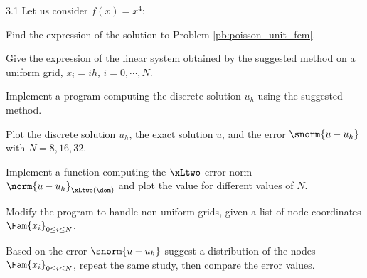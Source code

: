 \begin{tmaxrcs}{}{3.1}
\medskip
Let us consider $f(x) = x^4$:
\begin{tmatsks}
\item Find the expression of the solution to Problem \ref{pb:poisson_unit_fem}.
\item Give the expression of the linear system obtained by the suggested method on a uniform grid, \ie $x_i = i h$, $i = 0,\cdots, N$.
\item Implement a program computing the discrete solution $u_h$ using the suggested method.
\item Plot the discrete solution $u_h$, the exact solution $u$, and the error $\snorm{u - u_h}$ with $N=8,16,32$.
\item Implement a function computing the $\xLtwo$ error-norm $\norm{u -u _h}_{\xLtwo(\dom)}$ and plot the value for different values of $N$.
\item Modify the program to handle non-uniform grids, given a list of node coordinates $\Fam{x_i}_{0\leq i\leq N}$.
\item Based on the error $\snorm{u -u _h}$ suggest a distribution of the nodes $\Fam{x_i}_{0\leq i\leq N}$, repeat the same study, then compare the error values.
\end{tmatsks}
\end{tmaxrcs}

